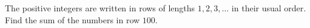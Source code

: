 The positive integers are written in rows of lengths $1,2,3,\ldots$ in their usual order. Find the sum of the numbers in row $100$.
